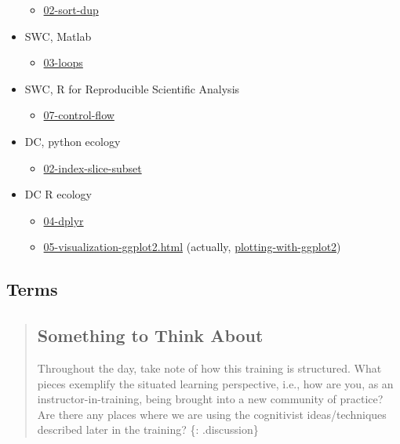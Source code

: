 \begin{itemize}
  \begin{itemize}
  \itemsep1pt\parskip0pt
  \item
    \href{\{\{\%20site.swc_pages\%20\}\}/sql-novice-survey/02-sort-dup/}{02-sort-dup}
  \end{itemize}
\item
  SWC, Matlab

  \begin{itemize}
  \itemsep1pt\parskip0pt
  \item
    \href{\{\{\%20site.swc_pages\%20\}\}/matlab-novice-inflammation/03-loops/}{03-loops}
  \end{itemize}
\item
  SWC, R for Reproducible Scientific Analysis

  \begin{itemize}
  \itemsep1pt\parskip0pt
  \item
    \href{\{\{\%20site.swc_pages\%20\}\}/r-novice-gapminder/07-control-flow/}{07-control-flow}
  \end{itemize}
\item
  DC, python ecology

  \begin{itemize}
  \itemsep1pt\parskip0pt
  \item
    \href{\{\{\%20site.dc_site\%20\}\}/python-ecology-lesson/02-index-slice-subset}{02-index-slice-subset}
  \end{itemize}
\item
  DC R ecology

  \begin{itemize}
  \itemsep1pt\parskip0pt
  \item
    \href{\{\{\%20site.dc_site\%20\}\}/R-ecology-lesson/04-dplyr.html}{04-dplyr}
  \item
    \href{\{\{\%20site.dc_site\%20\}\}/R-ecology-lesson/05-visualization-ggplot2.html}{05-visualization-ggplot2.html}
    (actually,
    \href{\{\{\%20site.dc_site\%20\}\}/R-ecology-lesson/05-visualization-ggplot2.html\#plotting-with-ggplot2}{plotting-with-ggplot2})
  \end{itemize}
\end{itemize}

\subsection{Terms}\label{terms}

\begin{quote}
\subsection{Something to Think About}\label{something-to-think-about}

Throughout the day, take note of how this training is structured. What
pieces exemplify the situated learning perspective, i.e., how are you,
as an instructor-in-training, being brought into a new community of
practice? Are there any places where we are using the cognitivist
ideas/techniques described later in the training? \{: .discussion\}
\end{quote}

